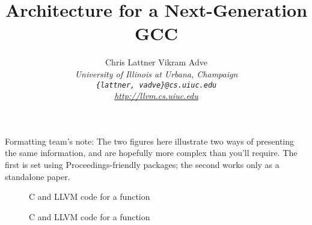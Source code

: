 \documentclass[twocolumn,12pt]{article}
\begin{document}
\date{}

\title{Architecture for a Next-Generation GCC}

\author{
Chris Lattner \hspace*{0.5in} Vikram Adve\\
\emph{University of Illinois at Urbana, Champaign}\\
\texttt{\em\normalsize \{lattner, vadve\}@cs.uiuc.edu}\\
\emph{\normalsize \url{http://llvm.cs.uiuc.edu}}} 

\maketitle

\thispagestyle{empty}

Formatting team's note:  The two figures here illustrate two ways of presenting
the same information, and are hopefully more complex
than you'll require.  The first is set using Proceedings-friendly
packages; the second works only as a standalone paper.

\begin{figure*}[t]
\scriptsize
{}\hspace*{5pt}\vrule\hspace*{5pt}
\caption{C and LLVM code for a function}
\label{figure:example}
\end{figure*}

%
\begin{figure*} [t]
\scriptsize
\centering
{}\hspace*{5pt}\vrule\hspace*{5pt}
%
\caption{C and LLVM code for a function}
\label{figure2:example}
\end{figure*}
%
\end{document}
